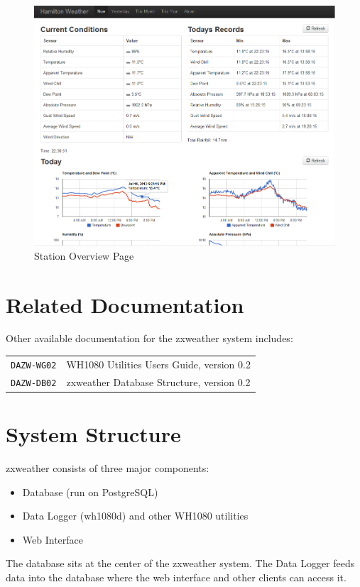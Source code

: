 \documentclass[a4paper,10pt,draft]{book}
\begin{document}
\begin {figure}[!ht]
 \centering
 \includegraphics[scale=0.574]{images/stat_overview}
 \caption{Station Overview Page}
 \label{img_station_overview}
\end {figure}

\section{Related Documentation}
Other available documentation for the zxweather system includes:

\begin{tabular}{l l}
\verb|DAZW-WG02| & WH1080 Utilities Users Guide, version 0.2 \\
\verb|DAZW-DB02| & zxweather Database Structure, version 0.2 \\
\end{tabular}

\section{System Structure}
zxweather consists of three major components:
\begin{itemize}
\item Database (run on PostgreSQL)
\item Data Logger (wh1080d) and other WH1080 utilities
\item Web Interface
\end{itemize}

The database sits at the center of the zxweather system. The Data Logger feeds data into the database where the web interface and other clients can access it.
\end{document}
